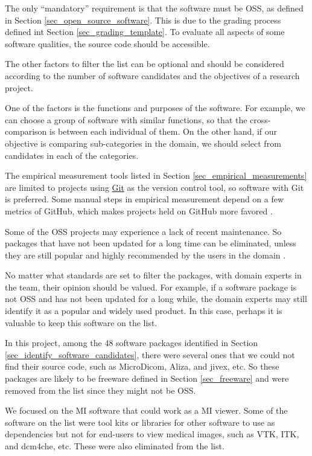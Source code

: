 The only ``mandatory'' requirement is that the software must be OSS, as defined in Section \ref{sec_open_source_software}. This is due to the grading process defined int Section \ref{sec_grading_template}. To evaluate all aspects of some software qualities, the source code should be accessible. 

The other factors to filter the list can be optional and should be considered according to the number of software candidates and the objectives of a research project.

One of the factors is the functions and purposes of the software. For example, we can choose a group of software with similar functions, so that the cross-comparison is between each individual of them. On the other hand, if our objective is comparing sub-categories in the domain, we should select from candidates in each of the categories.

The empirical measurement tools listed in Section \ref{sec_empirical_measurements} are limited to projects using \hyperlink{https://git-scm.com/}{Git} as the version control tool, so software with Git is preferred. Some manual steps in empirical measurement depend on a few metrics of GitHub, which makes projects held on GitHub more favored \cite{SmithEtAl2021}.

Some of the OSS projects may experience a lack of recent maintenance. So packages that have not been updated for a long time can be eliminated, unless they are still popular and highly recommended by the users in the domain \cite{SmithEtAl2021}.

No matter what standards are set to filter the packages, with domain experts in the team, their opinion should be valued. For example, if a software package is not OSS and has not been updated for a long while, the domain experts may still identify it as a popular and widely used product. In this case, perhaps it is valuable to keep this software on the list.

In this project, among the 48 software packages identified in Section \ref{sec_identify_software_candidates}, there were several ones that we could not find their source code, such as MicroDicom, Aliza, and jivex, etc. So these packages are likely to be freeware defined in Section \ref{sec_freeware} and were removed from the list since they might not be OSS.

We focused on the MI software that could work as a MI viewer. Some of the software on the list were tool kits or libraries for other software to use as dependencies but not for end-users to view medical images, such as VTK, ITK, and dcm4che, etc. These were also eliminated from the list.


